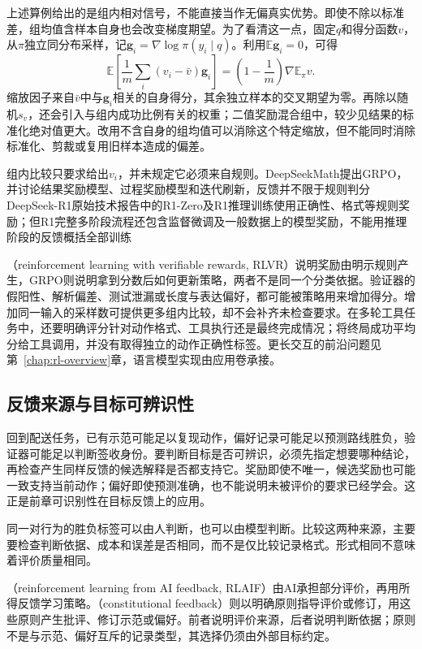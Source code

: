 上述算例给出的是组内相对信号，不能直接当作无偏真实优势。即使不除以标准差，组均值含样本自身也会改变梯度期望。为了看清这一点，固定$q$和得分函数$v$，从$\pi$独立同分布采样，记$\bm g_i=\nabla\log\pi(y_i\mid q)$。利用$\mathbb E\bm g_i=0$，可得
\[
  \mathbb E\left[\frac1m\sum_i(v_i-\bar v)\bm g_i\right]
  =\left(1-\frac1m\right)\nabla\mathbb E_\pi v.
\]
缩放因子来自$\bar v$中与$\bm g_i$相关的自身得分，其余独立样本的交叉期望为零。再除以随机$s_v$，还会引入与组内成功比例有关的权重；二值奖励混合组中，较少见结果的标准化绝对值更大。改用不含自身的组均值可以消除这个特定缩放，但不能同时消除标准化、剪裁或复用旧样本造成的偏差。

组内比较只要求给出$v_i$，并未规定它必须来自规则。DeepSeekMath提出GRPO，并讨论结果奖励模型、过程奖励模型和迭代刷新，反馈并不限于规则判分
DeepSeek-R1原始技术报告中的R1-Zero及R1推理训练使用正确性、格式等规则奖励；但R1完整多阶段流程还包含监督微调及一般数据上的模型奖励，不能用推理阶段的反馈概括全部训练

（reinforcement learning with verifiable rewards, RLVR）说明奖励由明示规则产生，GRPO则说明拿到分数后如何更新策略，两者不是同一个分类依据。验证器的假阳性、解析偏差、测试泄漏或长度与表达偏好，都可能被策略用来增加得分。增加同一输入的采样数可提供更多组内比较，却不会补齐未检查要求。在多轮工具任务中，还要明确评分针对动作格式、工具执行还是最终完成情况；将终局成功平均分给工具调用，并没有取得独立的动作正确性标签。更长交互的前沿问题见第~\ref{chap:rl-overview}章，语言模型实现由应用卷承接。

\subsection{反馈来源与目标可辨识性}
\label{sec:rl-reward-sources}

回到配送任务，已有示范可能足以复现动作，偏好记录可能足以预测路线胜负，验证器可能足以判断签收身份。要判断目标是否可辨识，必须先指定想要哪种结论，再检查产生同样反馈的候选解释是否都支持它。奖励即使不唯一，候选奖励也可能一致支持当前动作；偏好即使预测准确，也不能说明未被评价的要求已经学会。这正是前章可识别性在目标反馈上的应用。

同一对行为的胜负标签可以由人判断，也可以由模型判断。比较这两种来源，主要要检查判断依据、成本和误差是否相同，而不是仅比较记录格式。形式相同不意味着评价质量相同。

（reinforcement learning from AI feedback, RLAIF）由AI承担部分评价，再用所得反馈学习策略。（constitutional feedback）则以明确原则指导评价或修订，用这些原则产生批评、修订示范或偏好。前者说明评价来源，后者说明判断依据；原则不是与示范、偏好互斥的记录类型，其选择仍须由外部目标约定。


